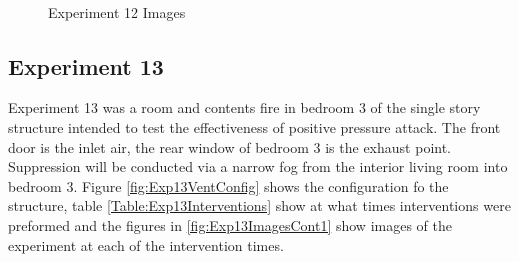 \documentclass{article}
\begin{document}
\begin{figure}[H]
	\ContinuedFloat 
	\centering 
	 \ 
	 \ 
	 \ 
	\caption{Experiment 12 Images}
	\label{fig:Experiment12ImagesCont3} 
\end{figure}

\subsection{Experiment 13}
Experiment 13 was a room and contents fire in bedroom 3 of the single story structure intended to test the effectiveness of positive pressure attack. The front door is the inlet air, the rear window of bedroom 3 is the exhaust point. Suppression will be conducted via a narrow fog from the interior living room into bedroom 3. Figure \ref{fig:Exp13VentConfig} shows the configuration fo the structure, table \ref{Table:Exp13Interventions} show at what times interventions were preformed and the figures in \ref{fig:Exp13ImagesCont1} show images of the experiment at each of the intervention times.
\end{document}
